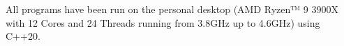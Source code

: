 All programs have been run on the personal desktop (AMD Ryzen™ 9 3900X with 12 Cores and 24 Threads running from 3.8GHz up to 4.6GHz) using C++20.